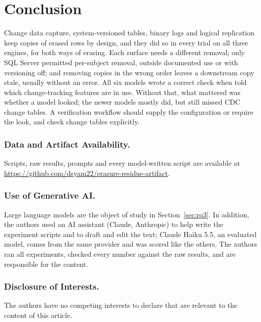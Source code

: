 \documentclass[runningheads]{llncs}
\newcommand{\artifacturl}{\url{https://github.com/dsyam22/erasure-residue-artifact}}
\begin{document}
\section{Conclusion}

Change data capture, system-versioned tables, binary logs and logical
replication keep copies of erased rows by design, and they did so in every
trial on all three engines, for both ways of erasing. Each surface needs a different removal; only SQL Server permitted
per-subject removal, outside documented use or with versioning off; and removing
copies in the wrong order leaves a downstream copy stale, usually without an
error. All six models wrote a correct check when told which change-tracking
features are in use. Without that, what mattered was whether a model looked;
the newer models mostly did, but still missed CDC change tables. A verification
workflow should supply the configuration or require the look, and check change
tables explicitly.

\subsubsection*{Data and Artifact Availability.} Scripts, raw results, prompts
and every model-written script are available at \artifacturl.

\subsubsection*{Use of Generative AI.} Large language models are the object of
study in Section~\ref{sec:rq3}. In addition, the authors used an AI assistant
(Claude, Anthropic) to help write the experiment scripts and to draft and edit
the text; Claude Haiku 5.5, an evaluated model, comes from the same provider
and was scored like the others. The authors ran all experiments, checked every
number against the raw results, and are responsible for the content.

\subsubsection*{Disclosure of Interests.} The authors have no competing interests
to declare that are relevant to the content of this article.
\end{document}
